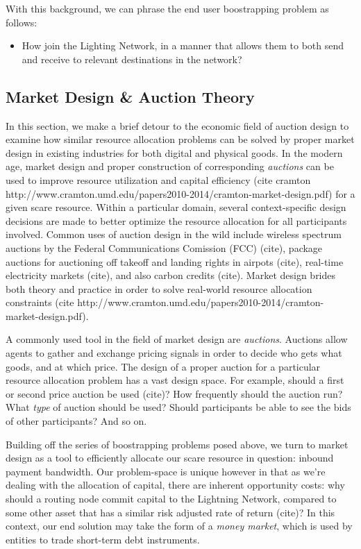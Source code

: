 \documentclass[12pt,a4paper]{article}
\theoremstyle{definition}
\begin{document}
With this background, we can phrase the end user boostrapping problem as
follows: 

\begin{itemize}
        \item How join the Lighting Network, in a manner that allows them to
            both send and receive to relevant destinations in the network? 
\end{itemize}


\subsection{Market Design \& Auction Theory}

In this section, we make a brief detour to the economic field of auction design
to examine how similar resource allocation problems can be solved by proper
market design in existing industries for both digital and physical goods. In
the modern age, market design and proper construction of corresponding
\emph{auctions} can be used to improve resource utilization and capital
efficiency (cite cramton
http://www.cramton.umd.edu/papers2010-2014/cramton-market-design.pdf) for a
given scare resource. Within a particular domain, several context-specific
design decisions are made to better optimize the resource allocation for all
participants involved. Common uses of auction design in the wild include
wireless spectrum auctions by the Federal Communications Comission (FCC)
(cite), package auctions for auctioning off takeoff and landing rights in
airpots (cite), real-time electricity markets (cite), and also carbon credits
(cite). Market design brides both theory and practice in order to solve
real-world resource allocation constraints (cite
http://www.cramton.umd.edu/papers2010-2014/cramton-market-design.pdf). 


A commonly used tool in the field of market design are \emph{auctions}.
Auctions allow agents to gather and exchange pricing signals in order to decide
who gets what goods, and at which price. The design of a proper auction for a
particular resource allocation problem has a vast design space. For example,
should a first or second price auction be used (cite)? How frequently should
the auction run? What \emph{type} of auction should be used? Should
participants be able to see the bids of other participants? And so on. 

Building off the series of boostrapping problems posed above, we turn to market
design as a tool to efficiently allocate our scare resource in question:
inbound payment bandwidth. Our problem-space is unique however in that as we're
dealing with the allocation of capital, there are inherent opportunity costs:
why should a routing node commit capital to the Lightning Network, compared to
some other asset that has a similar risk adjusted rate of return (cite)? In
this context, our end solution may take the form of a \emph{money market},
which is used by entities to trade short-term debt instruments. 
\end{document}
